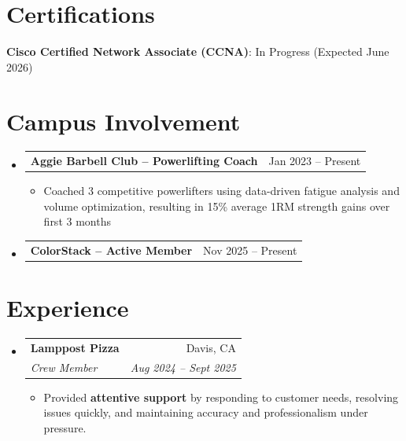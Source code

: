 \documentclass[letterpaper,11pt]{article}
\makeatletter
\newcommand{\resumeItem}[1]{
  \item\small{
    {#1 \vspace{-2pt}}
  }
}
\newcommand{\resumeSubheading}[4]{
  \vspace{-2pt}\item
    \begin{tabular*}{0.97\textwidth}[t]{l@{\extracolsep{\fill}}r}
      \textbf{#1} & #2 \\
      \textit{\small#3} & \textit{\small #4} \\
    \end{tabular*}\vspace{-7pt}
}
\newcommand{\resumeProjectHeading}[2]{
    \item
    \begin{tabular*}{0.97\textwidth}{l@{\extracolsep{\fill}}r}
      \small#1 & #2 \\
    \end{tabular*}\vspace{-7pt}
}
\newcommand{\resumeSubHeadingListStart}{\begin{itemize}[leftmargin=0.15in, label={}]}
\newcommand{\resumeSubHeadingListEnd}{\end{itemize}}
\newcommand{\resumeItemListStart}{\begin{itemize}}
\newcommand{\resumeItemListEnd}{\end{itemize}\vspace{-5pt}}
\makeatother
\begin{document}
\section{Certifications}
 \begin{itemize}[leftmargin=0.15in, label={}]
    \small{\item{
     \textbf{Cisco Certified Network Associate (CCNA)}{: In Progress (Expected June 2026)}
    }}
 \end{itemize}

\section{Campus Involvement}
  \resumeSubHeadingListStart
    \resumeProjectHeading
      {\textbf{Aggie Barbell Club -- Powerlifting Coach}}{Jan 2023 -- Present}
      \resumeItemListStart
        \resumeItem{Coached 3 competitive powerlifters using data-driven fatigue analysis and volume optimization, resulting in 15\% average 1RM strength gains over first 3 months}
      \resumeItemListEnd
    \resumeProjectHeading
      {\textbf{ColorStack -- Active Member}}{Nov 2025 -- Present}
  \resumeSubHeadingListEnd

\section{Experience}
  \resumeSubHeadingListStart
    \resumeSubheading
      {Lamppost Pizza}{Davis, CA}
      {Crew Member}{Aug 2024 -- Sept 2025}
      \resumeItemListStart
        \resumeItem{Provided \textbf{attentive support} by responding to customer needs, resolving issues quickly, and maintaining accuracy and professionalism under pressure.}
      \resumeItemListEnd
  \resumeSubHeadingListEnd
\end{document}
